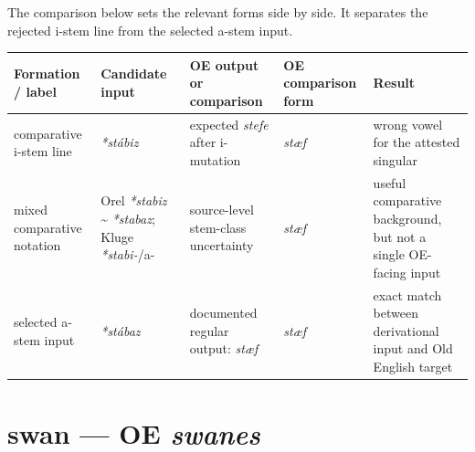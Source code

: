 \documentclass[
  british,
  a4paper,
  openany]{book}
\newcounter{none} %
\providecommand{\texorpdfstring}[2]{#1}
\begin{document}
The comparison below sets the relevant forms side by side. It separates
the rejected i-stem line from the selected a-stem input.

{\def\LTcaptype{none} %
\begin{longtable}[]{@{}
  >{\raggedright\arraybackslash}p{}
  >{\raggedright\arraybackslash}p{}
  >{\raggedright\arraybackslash}p{}
  >{\raggedright\arraybackslash}p{}
  >{\raggedright\arraybackslash}p{}@{}}
\toprule\noalign{}
\begin{minipage}[b]{\linewidth}\raggedright
Formation / label
\end{minipage} & \begin{minipage}[b]{\linewidth}\raggedright
Candidate input
\end{minipage} & \begin{minipage}[b]{\linewidth}\raggedright
OE output or comparison
\end{minipage} & \begin{minipage}[b]{\linewidth}\raggedright
OE comparison form
\end{minipage} & \begin{minipage}[b]{\linewidth}\raggedright
Result
\end{minipage} \\
\midrule\noalign{}
\endhead
\bottomrule\noalign{}
\endlastfoot
comparative i-stem line & {\emph{*stábiz}} & expected {\emph{stefe}}
after i-mutation & {\emph{stæf}} & wrong vowel for the attested
singular \\
mixed comparative notation & Orel \emph{*stabiz} \textasciitilde{}
\emph{*stabaz}; Kluge \emph{*stabi-}/a- & source-level stem-class
uncertainty & \emph{stæf} & useful comparative background, but not a
single OE-facing input \\
selected a-stem input & {\emph{*stábaz}} & documented regular output:
{\emph{stæf}} & {\emph{stæf}} & exact match between derivational input
and Old English target \\
\end{longtable}
}

\section{\texorpdfstring{swan --- OE
\emph{swanes}}{swan --- OE swanes}}\label{swan-oe-swanes}
\end{document}
